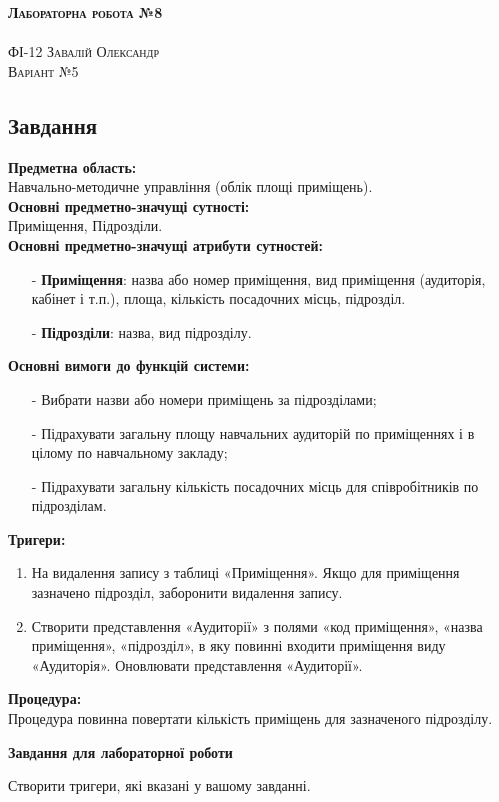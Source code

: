 \documentclass[a4paper,12pt]{article}
\begin{document}
	\begin{center}
		{\Large \bfseries \textsc{Лабораторна робота №8}}\\
		\hrulefill\\
		\Large \textsc{ФІ-12 Завалій Олександр\\ Варіант №5}
	\end{center}
	\begin{center}
		\section*{\bfseries{Завдання}}
	\end{center} 
	\textbf{Предметна область:} \\
	Навчально-методичне управління (облік площі приміщень). \\
	\textbf{Основні предметно-значущі сутності:} \\
	Приміщення, Підрозділи. \\
	\textbf{Основні предметно-значущі атрибути сутностей:}
	\begin{enumerate}
		\item[-] \textbf{Приміщення}: назва або номер приміщення, вид приміщення (аудиторія, кабінет і т.п.), площа, кількість посадочних місць, підрозділ. 
		\item[-] \textbf{Підрозділи}: назва, вид підрозділу.
	\end{enumerate}
	\textbf{Основні вимоги до функцій системи:}
	\begin{enumerate}
		\item[-] Вибрати назви або номери приміщень за підрозділами;
		\item[-] Підрахувати загальну площу навчальних аудиторій по приміщеннях і в цілому по навчальному закладу;
		\item[-] Підрахувати загальну кількість посадочних місць для співробітників по підрозділам.
	\end{enumerate}
	\textbf{Тригери:}
	\begin{enumerate}
		\item На видалення запису з таблиці «Приміщення». Якщо для приміщення зазначено підрозділ, заборонити видалення запису.
		\item Створити представлення «Аудиторії» з полями «код приміщення», «назва приміщення», «підрозділ», в яку повинні входити приміщення виду «Аудиторія». Оновлювати представлення «Аудиторії».
	\end{enumerate}
	\textbf{Процедура:}\\
	Процедура повинна повертати кількість приміщень для зазначеного підрозділу. \\
	\begin{center}
		\textbf{Завдання для лабораторної роботи}
	\end{center}
    Створити тригери, які вказані у вашому завданні.
\end{document}
